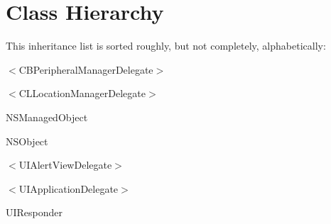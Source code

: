 \section{Class Hierarchy}
This inheritance list is sorted roughly, but not completely, alphabetically\+:\begin{DoxyCompactList}
\item $<$C\+B\+Peripheral\+Manager\+Delegate$>$\begin{DoxyCompactList}
\item {}
\end{DoxyCompactList}
\item $<$C\+L\+Location\+Manager\+Delegate$>$\begin{DoxyCompactList}
\item {}
\end{DoxyCompactList}
\item N\+S\+Managed\+Object\begin{DoxyCompactList}
\item {}
\end{DoxyCompactList}
\item N\+S\+Object\begin{DoxyCompactList}
\item {}
\item {}
\end{DoxyCompactList}
\item $<$U\+I\+Alert\+View\+Delegate$>$\begin{DoxyCompactList}
\item {}
\end{DoxyCompactList}
\item $<$U\+I\+Application\+Delegate$>$\begin{DoxyCompactList}
\item {}
\end{DoxyCompactList}
\item U\+I\+Responder\begin{DoxyCompactList}
\item {}

\end{DoxyCompactList}
\end{DoxyCompactList}
